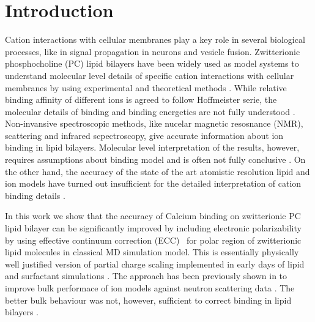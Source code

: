 \documentclass[aip,jcp,twocolumn]{revtex4}
\begin{document}
\section{Introduction}
Cation interactions with cellular membranes play a key role in several biological processes,
like in signal propagation in neurons and vesicle fusion.
Zwitterionic phosphocholine (PC) lipid bilayers have been widely used as model systems
to understand molecular level details of specific cation interactions with
cellular membranes by using experimental \cite{cevc90,tocanne90,binder02,pabst07,uhrikova08}
and theoretical methods \cite{bockmann03,bockmann04,Berkowitz12,??} .
While relative binding affinity of different ions is agreed to follow Hoffmeister
serie, the molecular details of binding and binding energetics are
not fully understood \cite{cevc90,tocanne90,seelig90,binder02,catte16,??}.
Non-invansive spectroscopic methods, like nucelar magnetic resosnance (NMR), scattering
and infrared scpectroscopy, give accurate information about ion binding
in lipid bilayers\cite{hauser76,hauser78,herbette84,akutsu81,altenbach84,binder02}. 
Molecular level interpretation of the results, however, requires assumptions
about binding model and is often not fully conclusive \cite{??}.
On the other hand, the accuracy of the state of the art atomistic resolution lipid and ion models
have turned out insufficient for the detailed interpretation of cation binding details \cite{catte16}.


In this work we show that the accuracy of Calcium binding
on zwitterionic PC lipid bilayer can be significantly improved by including electronic polarizability
by using effective continuum correction (ECC)~\cite{leontyev11} for polar region of zwitterionic lipid molecules
in classical MD simulation model.
This is essentially physically well justified version of partial charge scaling
implemented in early days of lipid and surfactant simulations \cite{jonsson86,egberts94}. 
The approach has been previously shown in to improve bulk performace of
ion models against neutron scattering data \cite{Jungwirth2015,kohagen14,kohagen16}.
The better bulk behaviour was not, however, sufficient to correct binding in lipid
bilayers \cite{catte16}. 
\end{document}
